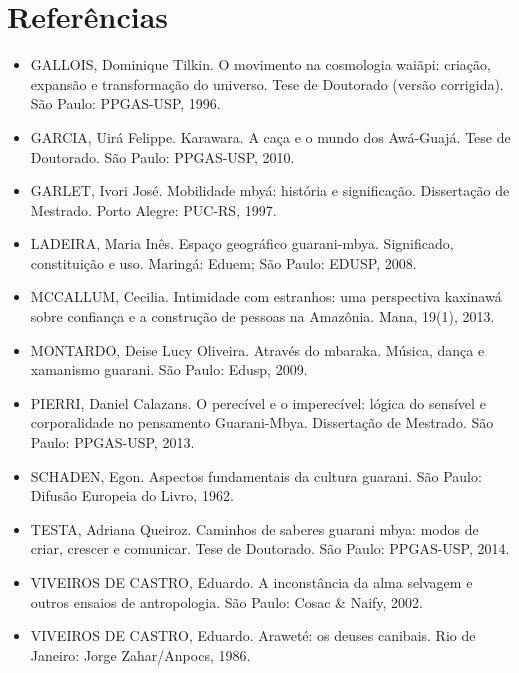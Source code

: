 \section{Referências}

\begin{itemize}
\item GALLOIS, Dominique Tilkin. O movimento na cosmologia waiãpi:
criação, expansão e transformação do universo. Tese de Doutorado
(versão corrigida). São Paulo: PPGAS-USP, 1996.

\item GARCIA, Uirá Felippe. Karawara. A caça e o mundo dos Awá-Guajá.
Tese de Doutorado. São Paulo: PPGAS-USP, 2010.

\item GARLET, Ivori José. Mobilidade mbyá: história e significação.
Dissertação de Mestrado. Porto Alegre: PUC-RS, 1997.

\item LADEIRA, Maria Inês. Espaço geográfico guarani-mbya. Significado,
constituição e uso. Maringá: Eduem; São Paulo: EDUSP, 2008.

\item MCCALLUM, Cecilia. Intimidade com estranhos: uma perspectiva
kaxinawá sobre confiança e a construção de pessoas na Amazônia. Mana,
19(1), 2013.

\item MONTARDO, Deise Lucy Oliveira. Através do mbaraka. Música, dança e
xamanismo guarani. São Paulo: Edusp, 2009.

\item PIERRI, Daniel Calazans. O perecível e o imperecível: lógica do
sensível e corporalidade no pensamento Guarani-Mbya. Dissertação de
Mestrado. São Paulo: PPGAS-USP, 2013.

\item SCHADEN, Egon. Aspectos fundamentais da cultura guarani. São
Paulo: Difusão Europeia do Livro, 1962.

\item TESTA, Adriana Queiroz. Caminhos de saberes guarani mbya: modos de
criar, crescer e comunicar. Tese de Doutorado. São Paulo: PPGAS-USP,
2014.

\item VIVEIROS DE CASTRO, Eduardo. A inconstância da alma selvagem e
outros ensaios de antropologia. São Paulo: Cosac \& Naify, 2002.

\item VIVEIROS DE CASTRO, Eduardo. Araweté: os deuses canibais. Rio de
Janeiro: Jorge Zahar/Anpocs, 1986.

\end{itemize}

